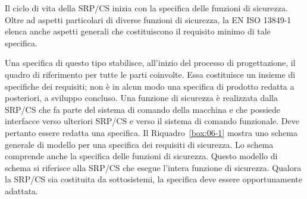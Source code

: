 Il ciclo di vita della SRP/CS inizia con la specifica delle funzioni di sicurezza. Oltre ad aspetti particolari di diverse funzioni di sicurezza, la EN ISO 13849-1 elenca anche aspetti generali che costituiscono il requisito minimo di tale specifica.

Una specifica di questo tipo stabilisce, all'inizio del processo di progettazione, il quadro di riferimento per tutte le parti coinvolte. Essa costituisce un insieme di specifiche dei requisiti; non è in alcun modo una specifica di prodotto redatta a posteriori, a sviluppo concluso. Una funzione di sicurezza è realizzata dalla SRP/CS che fa parte del sistema di comando della macchina e che possiede interfacce verso ulteriori SRP/CS e verso il sistema di comando funzionale. Deve pertanto essere redatta una specifica. Il Riquadro~\ref{box:06-1} mostra uno schema generale di modello per una specifica dei requisiti di sicurezza. Lo schema comprende anche la specifica delle funzioni di sicurezza. Questo modello di schema si riferisce alla SRP/CS che esegue l'intera funzione di sicurezza. Qualora la SRP/CS sia costituita da sottosistemi, la specifica deve essere opportunamente adattata.

\begin{center}
    \begin{minipage}{\textwidth}
        \centering
        \captionsetup{hypcap=false}
        \resizebox{\textwidth}{!}{}
        \label{fig:06-03}
    \end{minipage}
\end{center}

